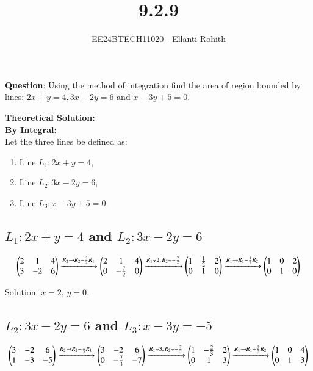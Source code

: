 \documentclass[journal]{IEEEtran}
\numberwithin{equation}{enumi}
\numberwithin{figure}{enumi}
\renewcommand{\thetable}{\theenumi}
\begin{document}

\vspace{3cm}

\title{9.2.9}
\author{EE24BTECH11020 - Ellanti Rohith}
\maketitle

\renewcommand{\thefigure}{\theenumi}
\renewcommand{\thetable}{\theenumi}

\textbf{Question}: Using the method of integration find the area of region bounded by lines: $2x+y=4,3x-2y=6\text{ and } x-3y+5=0$.
\\
\vspace{3.5pt}


\textbf{Theoretical Solution:} \\
\textbf{By Integral:}\\
Let the three lines be defined as:  
\begin{enumerate}
    \item Line $ L_1: 2x + y = 4 $,  
    \item Line $ L_2: 3x - 2y = 6 $,  
    \item Line $ L_3: x - 3y + 5 = 0 $.  

\end{enumerate}
  
\subsection*{ $L_1: 2x + y = 4$ and $L_2: 3x - 2y = 6$}

\begin{align*}
\begin{pmatrix}
2 & 1 & 4 \\
3 & -2 & 6
\end{pmatrix}
\xrightarrow{R_2 \to R_2 - \frac{3}{2}R_1}
\begin{pmatrix}
2 & 1 & 4 \\
0 & -\frac{7}{2} & 0
\end{pmatrix}
\xrightarrow{R_1 \div 2, \, R_2 \div -\frac{7}{2}}
\begin{pmatrix}
1 & \frac{1}{2} & 2 \\
0 & 1 & 0
\end{pmatrix}
\xrightarrow{R_1 \to R_1 - \frac{1}{2}R_2}
\begin{pmatrix}
1 & 0 & 2 \\
0 & 1 & 0
\end{pmatrix}
\end{align*}

Solution: $x = 2, \, y = 0$.

\subsection*{$L_2: 3x - 2y = 6$ and $L_3: x - 3y = -5$}

\begin{align*}
\begin{pmatrix}
3 & -2 & 6 \\
1 & -3 & -5
\end{pmatrix}
\xrightarrow{R_2 \to R_2 - \frac{1}{3}R_1}
\begin{pmatrix}
3 & -2 & 6 \\
0 & -\frac{7}{3} & -7
\end{pmatrix}
\xrightarrow{R_1 \div 3, \, R_2 \div -\frac{7}{3}}
\begin{pmatrix}
1 & -\frac{2}{3} & 2 \\
0 & 1 & 3
\end{pmatrix}
\xrightarrow{R_1 \to R_1 + \frac{2}{3}R_2}
\begin{pmatrix}
1 & 0 & 4 \\
0 & 1 & 3
\end{pmatrix}
\end{align*}
\end{document}
